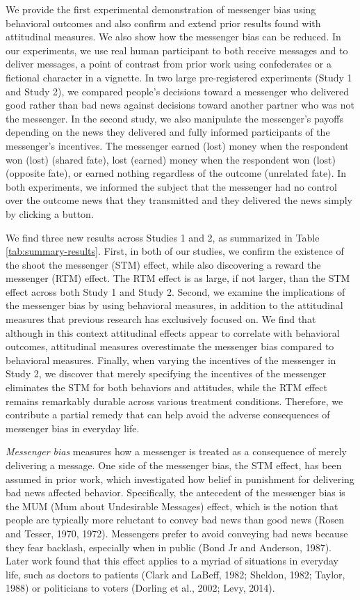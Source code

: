 We provide the first experimental demonstration of messenger bias using
behavioral outcomes and also confirm and extend prior results found with
attitudinal measures. We also show how the messenger bias
can be reduced. In our experiments, we use real human participant to
both receive messages and to deliver messages, a point of contrast from
prior work using confederates or a fictional character in a vignette. In
two large pre-registered experiments (Study 1 and Study 2), we compared
people's decisions toward a messenger who delivered good rather than bad
news against decisions toward another partner who was not the messenger. In
the second study, we also manipulate the messenger's payoffs depending
on the news they delivered and fully informed participants of the
messenger's incentives. The messenger earned (lost) money when the
respondent won (lost) (shared fate), lost (earned) money when the respondent
won (lost) (opposite fate), or earned nothing regardless of the outcome
(unrelated fate). In both experiments, we informed the subject that the
messenger had no control over the outcome news that they transmitted and
they delivered the news simply by clicking a button.



We find three new results across Studies 1 and 2, as summarized in 
Table \ref{tab:summary-results}. First, in both of our
studies, we confirm the existence of the shoot the messenger (STM)
effect, while also discovering a reward the messenger (RTM) effect. The
RTM effect is as large, if not larger, than the STM effect across both
Study 1 and Study 2. Second, we examine the implications of the
messenger bias by using behavioral measures, in addition to the
attitudinal measures that previous research has exclusively focused on.
We find that although in this context attitudinal effects appear to
correlate with behavioral outcomes, attitudinal measures overestimate
the messenger bias compared to behavioral measures. Finally, when
varying the incentives of the messenger in Study 2, we discover that
merely specifying the incentives of the messenger eliminates the STM for
both behaviors and attitudes, while the RTM effect remains remarkably
durable across various treatment conditions. Therefore, we contribute a
partial remedy that can help avoid the adverse consequences of messenger
bias in everyday life.


\emph{Messenger bias} measures how a messenger is treated as a
consequence of merely delivering a message. One side of the messenger
bias, the STM effect, has been assumed in prior work, which investigated
how belief in punishment for delivering bad news affected behavior.
Specifically, the antecedent of the messenger bias is the MUM (Mum about
Undesirable Messages) effect, which is the notion that people are
typically more reluctant to convey bad news than good news (Rosen and
Tesser, 1970, 1972). Messengers prefer to avoid conveying bad news
because they fear backlash, especially when in public (Bond Jr and
Anderson, 1987). Later work found that this effect applies to a myriad
of situations in everyday life, such as doctors to patients (Clark and
LaBeff, 1982; Sheldon, 1982; Taylor, 1988) or politicians to voters
(Dorling et al., 2002; Levy, 2014).

